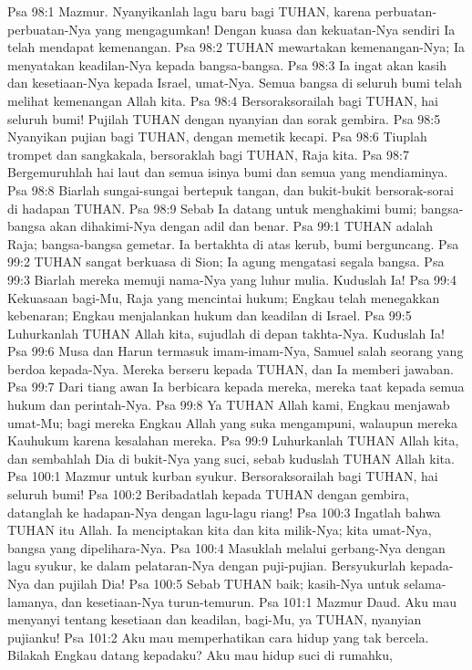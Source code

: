 Psa 98:1  Mazmur. Nyanyikanlah lagu baru bagi TUHAN, karena perbuatan-perbuatan-Nya yang mengagumkan! Dengan kuasa dan kekuatan-Nya sendiri Ia telah mendapat kemenangan.
Psa 98:2  TUHAN mewartakan kemenangan-Nya; Ia menyatakan keadilan-Nya kepada bangsa-bangsa.
Psa 98:3  Ia ingat akan kasih dan kesetiaan-Nya kepada Israel, umat-Nya. Semua bangsa di seluruh bumi telah melihat kemenangan Allah kita.
Psa 98:4  Bersoraksorailah bagi TUHAN, hai seluruh bumi! Pujilah TUHAN dengan nyanyian dan sorak gembira.
Psa 98:5  Nyanyikan pujian bagi TUHAN, dengan memetik kecapi.
Psa 98:6  Tiuplah trompet dan sangkakala, bersoraklah bagi TUHAN, Raja kita.
Psa 98:7  Bergemuruhlah hai laut dan semua isinya bumi dan semua yang mendiaminya.
Psa 98:8  Biarlah sungai-sungai bertepuk tangan, dan bukit-bukit bersorak-sorai di hadapan TUHAN.
Psa 98:9  Sebab Ia datang untuk menghakimi bumi; bangsa-bangsa akan dihakimi-Nya dengan adil dan benar.
Psa 99:1  TUHAN adalah Raja; bangsa-bangsa gemetar. Ia bertakhta di atas kerub, bumi berguncang.
Psa 99:2  TUHAN sangat berkuasa di Sion; Ia agung mengatasi segala bangsa.
Psa 99:3  Biarlah mereka memuji nama-Nya yang luhur mulia. Kuduslah Ia!
Psa 99:4  Kekuasaan bagi-Mu, Raja yang mencintai hukum; Engkau telah menegakkan kebenaran; Engkau menjalankan hukum dan keadilan di Israel.
Psa 99:5  Luhurkanlah TUHAN Allah kita, sujudlah di depan takhta-Nya. Kuduslah Ia!
Psa 99:6  Musa dan Harun termasuk imam-imam-Nya, Samuel salah seorang yang berdoa kepada-Nya. Mereka berseru kepada TUHAN, dan Ia memberi jawaban.
Psa 99:7  Dari tiang awan Ia berbicara kepada mereka, mereka taat kepada semua hukum dan perintah-Nya.
Psa 99:8  Ya TUHAN Allah kami, Engkau menjawab umat-Mu; bagi mereka Engkau Allah yang suka mengampuni, walaupun mereka Kauhukum karena kesalahan mereka.
Psa 99:9  Luhurkanlah TUHAN Allah kita, dan sembahlah Dia di bukit-Nya yang suci, sebab kuduslah TUHAN Allah kita.
Psa 100:1  Mazmur untuk kurban syukur. Bersoraksorailah bagi TUHAN, hai seluruh bumi!
Psa 100:2  Beribadatlah kepada TUHAN dengan gembira, datanglah ke hadapan-Nya dengan lagu-lagu riang!
Psa 100:3  Ingatlah bahwa TUHAN itu Allah. Ia menciptakan kita dan kita milik-Nya; kita umat-Nya, bangsa yang dipelihara-Nya.
Psa 100:4  Masuklah melalui gerbang-Nya dengan lagu syukur, ke dalam pelataran-Nya dengan puji-pujian. Bersyukurlah kepada-Nya dan pujilah Dia!
Psa 100:5  Sebab TUHAN baik; kasih-Nya untuk selama-lamanya, dan kesetiaan-Nya turun-temurun.
Psa 101:1  Mazmur Daud. Aku mau menyanyi tentang kesetiaan dan keadilan, bagi-Mu, ya TUHAN, nyanyian pujianku!
Psa 101:2  Aku mau memperhatikan cara hidup yang tak bercela. Bilakah Engkau datang kepadaku? Aku mau hidup suci di rumahku,
